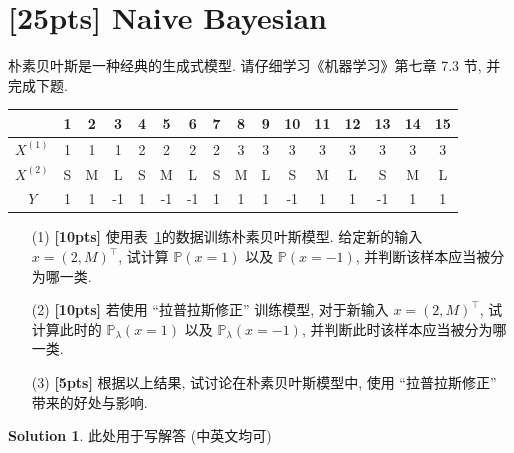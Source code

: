 \documentclass[a4paper,UTF8]{article}
\numberwithin{equation}{section}
\theoremstyle{definition}
\newtheorem*{solution}{Solution}
\begin{document}
  \section{[25pts] Naive Bayesian}
朴素贝叶斯是一种经典的生成式模型. 请仔细学习《机器学习》第七章 7.3 节, 并完成下题. 

\begin{table}[H]
\label{tab:data1}
\centering
\begin{tabular}{c|*{15}{c}}
    \hline
   & 1 & 2 & 3 & 4 & 5 & 6 & 7 & 8 & 9 & 10 & 11 & 12 & 13 & 14 & 15 \\
  \hline
  $X^{(1)}$ & 1 & 1 & 1 & 2 & 2 & 2 & 2 & 3 & 3 & 3 & 3 & 3 & 3 & 3 & 3 \\
  $X^{(2)}$ & S & M & L & S & M & L & S & M & L & S & M & L & S & M & L \\
  $Y$ & 1 & 1 & -1 & 1 & -1 & -1 & 1 & 1 & 1 & -1 & 1 & 1 & -1 & 1 & 1 \\
  \hline
\end{tabular}
\end{table}       
\begin{enumerate}
    \item[(1)] \textbf{[10pts]} 使用表~\ref{tab:data1}的数据训练朴素贝叶斯模型. 给定新的输入 $x = (2, M)^\top$, 试计算 $\mathbb{P}(x=1)$ 以及 $\mathbb{P}(x=-1)$, 并判断该样本应当被分为哪一类.
    \item[(2)] \textbf{[10pts]} 若使用 “拉普拉斯修正” 训练模型, 对于新输入 $x = (2, M)^\top$, 试计算此时的 $\mathbb{P}_\lambda (x=1)$ 以及 $\mathbb{P}_\lambda (x=-1)$, 并判断此时该样本应当被分为哪一类. 
    \item[(3)] \textbf{[5pts]} 根据以上结果, 试讨论在朴素贝叶斯模型中, 使用 “拉普拉斯修正” 带来的好处与影响.
\end{enumerate}

 
\begin{solution}
    此处用于写解答 (中英文均可)
    ~\\
\end{solution}


\newpage
\end{document}
